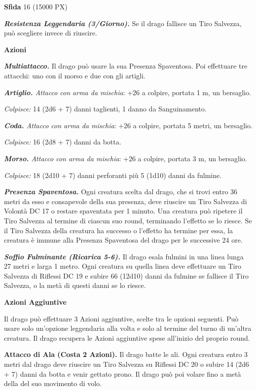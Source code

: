 \begin{multicols}{2}
\textbf{Sfida} 16 (15000 PX)

\textit{\textbf{Resistenza Leggendaria (3/Giorno).}} Se il drago fallisce un Tiro Salvezza, può scegliere invece di riuscire.

\textbf{Azioni}

\textit{\textbf{Multiattacco.}} Il drago può usare la sua Presenza Spaventosa. Poi effettuare tre attacchi: uno con il morso e due con gli artigli.

\textit{\textbf{Artiglio.} Attacco con arma da mischia}: +26 a colpire, portata 1 m, un bersaglio.

\textit{Colpisce:} 14 (2d6 + 7) danni taglienti, 1 danno da Sanguinamento.

\textit{\textbf{Coda.} Attacco con arma da mischia}: +26 a colpire, portata 5 metri, un bersaglio.

\textit{Colpisce:} 16 (2d8 + 7) danni da botta.

\textit{\textbf{Morso.} Attacco con arma da mischia}: +26 a colpire, portata 3 m, un bersaglio.

\textit{Colpisce:} 18 (2d10 + 7) danni perforanti più 5 (1d10) danni da fulmine.

\textit{\textbf{Presenza Spaventosa.}} Ogni creatura scelta dal drago, che si trovi entro 36 metri da esso e consapevole della sua presenza, deve riuscire un Tiro Salvezza di Volontà DC 17 o restare spaventata per 1 minuto. Una creatura può ripetere il Tiro Salvezza al termine di ciascun suo round, terminando l'effetto se lo riesce. Se il Tiro Salvezza della creatura ha successo o l'effetto ha termine per essa, la creatura è immune alla Presenza Spaventosa del drago per le successive 24 ore.

\textit{\textbf{Soffio Fulminante (Ricarica 5-6).}} Il drago esala fulmini in una linea lunga 27 metri e larga 1 metro. Ogni creatura su quella linea deve effettuare un Tiro Salvezza di Riflessi DC 19 e subire 66 (12d10) danni da fulmine se fallisce il Tiro Salvezza, o la metà di questi danni se lo riesce.

\textbf{Azioni Aggiuntive}

Il drago può effettuare 3 Azioni aggiuntive, scelte tra le opzioni seguenti. Può usare solo un'opzione leggendaria alla volta e solo al termine del turno di un'altra creatura. Il drago recupera le Azioni aggiuntive spese all'inizio del proprio round.

\textbf{Attacco di Ala (Costa 2 Azioni).} Il drago batte le ali. Ogni creatura entro 3 metri dal drago deve riuscire un Tiro Salvezza su Riflessi DC 20 o subire 14 (2d6 + 7) danni da botta e venir gettato prono. Il drago può poi volare fino a metà della del suo movimento di volo.


\end{multicols}
